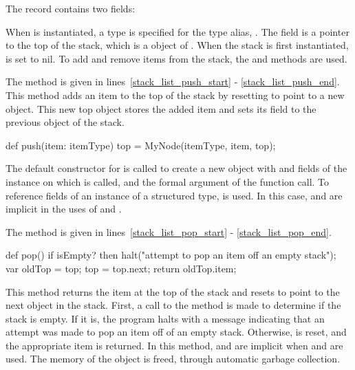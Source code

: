 The  record contains two fields:
\begin{chapel}
record Stack {                      
  type itemType;                   
  var top: MyNode(itemType);      
\end{chapel}
When  is instantiated, a type is specified for the type
alias, .  The  field is a pointer to the top
of the stack, which is a  object of .  When
the stack is first instantiated,  is set to nil.  To 
add and remove items from the stack, the  and  
methods are used.

The  method is given in lines~\ref{stack_list_push_start} -
\ref{stack_list_push_end}.  This method adds an item to the top of the stack
by resetting  to point to a new  object.  This new
top object stores the added item and sets its  field to the previous
 object of the stack.
\begin{chapel}
  def push(item: itemType) {        
    top = MyNode(itemType, item, top); 
  }                                 
\end{chapel}
The default constructor for  is called to create a new
object with  and  fields
of the  instance on which  is called, and the
formal argument  of the  function call.
To reference
fields of an instance of a structured type,  is used.
In this case,  and  are 
implicit in the uses of  and . 

The  method is given in lines~\ref{stack_list_pop_start} -
\ref{stack_list_pop_end}.  
\begin{chapel}
  def pop() {           
    if isEmpty? then   
      halt("attempt to pop an item off an empty stack"); 
    var oldTop = top;               
    top = top.next;                
    return oldTop.item;           
  }                              
\end{chapel}
This method returns the item at the top of
the stack and resets  to point to the next object in the stack.
First, a call to the  method  is made to 
determine if the stack is
empty.  If it is, the program halts with a message indicating that 
an attempt was made to pop an item off of an empty stack.  Otherwise,
 is reset, and the appropriate item is returned.
In this method,  and  are implicit when
 and  are used.
The memory of the  object is freed, through automatic
garbage collection.


